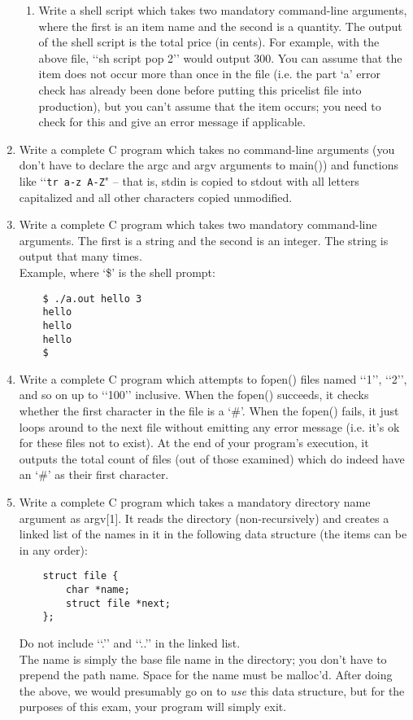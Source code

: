 \documentclass[11pt]{article}
\begin{document}
\begin{enumerate}
\begin{enumerate}
				\item Write a shell script which takes two mandatory command-line arguments, where the first is an item name and the second is a quantity. The output of the shell script is the total price (in cents). For example, with the above file, ‘‘sh script pop 2’’ would output 300.
				You can assume that the item does not occur more than once in the file (i.e. the part ‘a’ error check has already been done before putting this pricelist file into production), but you can’t assume that the item occurs; you need to check for this and give an error message if applicable.
					
			\end{enumerate}
		
	\newpage
	\item Write a complete C program which takes no command-line arguments (you don’t have to declare the argc and argv arguments to main()) and functions like ‘‘\Verb|tr a-z A-Z|" -- that is, stdin is copied to stdout with all letters capitalized and all other characters copied unmodified.
		
	
	\item Write a complete C program which takes two mandatory command-line arguments. The first is a string and the second is an integer. The string is output that many times.\\
		Example, where `\$’ is the shell prompt:\begin{Verbatim}
	$ ./a.out hello 3
	hello
	hello
	hello
	$
		\end{Verbatim}
		
		
	\newpage
	\item Write a complete C program which attempts to fopen() files named ‘‘1’’, ‘‘2’’, and so on up to ‘‘100’’ inclusive. When the fopen() succeeds, it checks whether the first character in the file is a ‘\#’. When the fopen() fails, it just loops around to the next file without emitting any error message (i.e. it’s ok for these files not to exist). At the end of your program’s execution, it outputs the total count of files (out of those examined) which do indeed have an ‘\#’ as their first character.
		
		
	\newpage
	\item Write a complete C program which takes a mandatory directory name argument as argv[1]. It reads the directory (non-recursively) and creates a linked list of the names in it in the following data structure (the items can be in any order):\begin{Verbatim}
	struct file {
		char *name;
		struct file *next;
	};
	\end{Verbatim}
	Do not include ‘‘.’’ and ‘‘..’’ in the linked list.\\
	The name is simply the base file name in the directory; you don’t have to prepend the path name. Space for the name must be malloc’d. After doing the above, we would presumably go on to \textit{use} this data structure, but for the purposes of this exam, your program will simply exit.
		


\end{enumerate}
\end{document}
